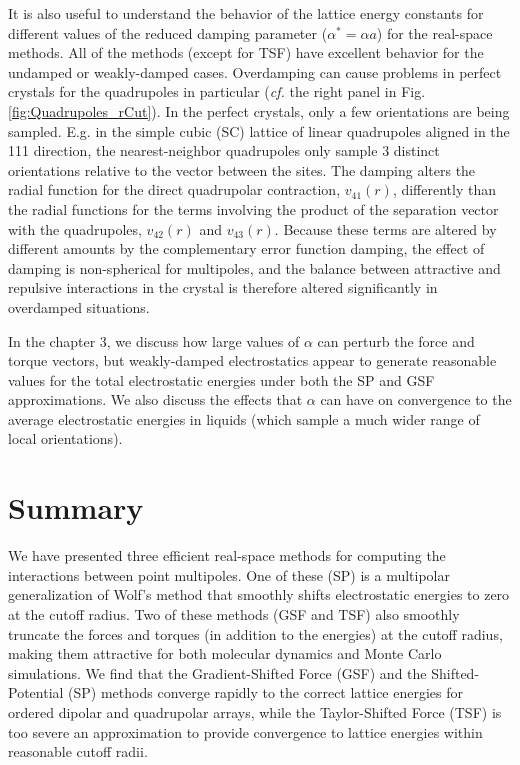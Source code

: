 It is also useful to understand the behavior of the lattice energy
constants for different values of the reduced damping parameter
($\alpha^* = \alpha a$) for the real-space methods. All of the methods
(except for TSF) have excellent behavior for the undamped or
weakly-damped cases.  Overdamping can cause problems in perfect
crystals for the quadrupoles in particular ({\it cf.} the right panel
in Fig. \ref{fig:Quadrupoles_rCut}). In the perfect crystals, only a
few orientations are being sampled.  E.g. in the simple cubic (SC)
lattice of linear quadrupoles aligned in the 111 direction, the
nearest-neighbor quadrupoles only sample 3 distinct orientations
relative to the vector between the sites.  The damping alters the
radial function for the direct quadrupolar contraction, $v_{41}(r)$,
differently than the radial functions for the terms involving the
product of the separation vector with the quadrupoles, $v_{42}(r)$ and
$v_{43}(r)$.  Because these terms are altered by different amounts by
the complementary error function damping, the effect of damping is
non-spherical for multipoles, and the balance between attractive and
repulsive interactions in the crystal is therefore altered
significantly in overdamped situations.

In the chapter 3, we discuss how large values of
$\alpha$ can perturb the force and torque vectors, but weakly-damped
electrostatics appear to generate reasonable values for the total
electrostatic energies under both the SP and GSF approximations.  We
also discuss the effects that $\alpha$ can have on convergence to the
average electrostatic energies in liquids (which sample a much wider
range of local orientations).

\section{Summary}
We have presented three efficient real-space methods for computing the
interactions between point multipoles.  One of these (SP) is a
multipolar generalization of Wolf's method that smoothly shifts
electrostatic energies to zero at the cutoff radius. Two of these
methods (GSF and TSF) also smoothly truncate the forces and torques
(in addition to the energies) at the cutoff radius, making them
attractive for both molecular dynamics and Monte Carlo simulations. We
find that the Gradient-Shifted Force (GSF) and the Shifted-Potential
(SP) methods converge rapidly to the correct lattice energies for
ordered dipolar and quadrupolar arrays, while the Taylor-Shifted Force
(TSF) is too severe an approximation to provide convergence to lattice
energies within reasonable cutoff radii.

